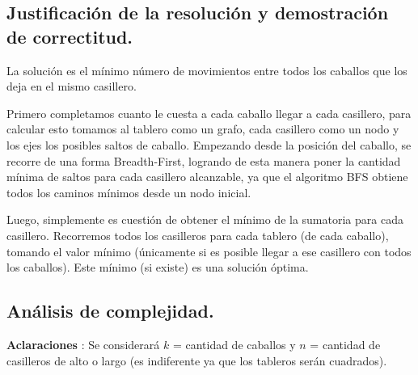 \newpage
\subsection{Justificación de la resolución y demostración de correctitud.}

\vspace*{0.3cm}

La solución es el mínimo número de movimientos entre todos los caballos que
los deja en el mismo casillero.

Primero completamos cuanto le cuesta a cada caballo llegar a cada
casillero, para calcular esto tomamos al tablero como un grafo, cada
casillero como un nodo y los ejes los posibles saltos de caballo. Empezando
desde la posición del caballo, se recorre de una forma Breadth-First,
logrando de esta manera poner la cantidad mínima de saltos para cada
casillero alcanzable, ya que el algoritmo BFS obtiene todos los caminos
mínimos desde un nodo inicial.

Luego, simplemente es cuestión de obtener el mínimo de la sumatoria para cada casillero.
Recorremos todos los casilleros para cada tablero (de cada caballo),
tomando el valor mínimo (únicamente si es posible llegar a ese casillero
con todos los caballos).
Este mínimo (si existe) es una solución óptima.

\newpage
\subsection{Análisis de complejidad.}

\vspace*{0.3cm}

\textbf{Aclaraciones} : Se considerará $k$ = cantidad de caballos
 y $n$ = cantidad de casilleros de alto o largo (es indiferente ya que los
 tableros serán cuadrados).

